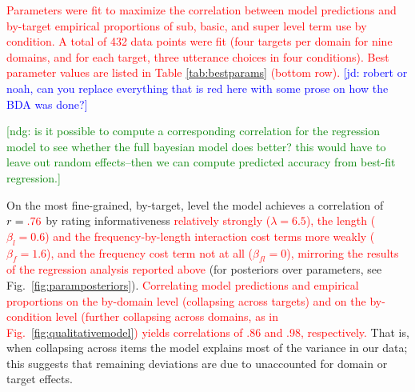 \documentclass[10pt,letterpaper]{article}
\newcommand{\jd}[1]{\textcolor{Blue}{[jd: #1]}}
\newcommand{\red}[1]{\textcolor{Red}{#1}}
\newcommand{\ndg}[1]{\textcolor{Green}{[ndg: #1]}}
\newcommand{\tableref}[1]{Table \ref{#1}}
\newcommand{\figref}[1]{Fig.~\ref{#1}}
\begin{document}
\red{Parameters were fit to maximize the correlation between model predictions and by-target empirical proportions of sub, basic, and super level term use by condition. A total of 432 data points were fit (four targets per domain for nine domains, and for each target, three utterance choices in four conditions).  Best parameter values are listed in \tableref{tab:bestparams} (bottom row). } \jd{robert or noah, can you replace everything that is red here with some prose on how the BDA was done?}

\ndg{is it possible to compute a corresponding correlation for the regression model to see whether the full bayesian model does better? this would have to leave out random effects--then we can compute predicted accuracy from best-fit regression.}
%


On the most fine-grained, by-target, level the model achieves a correlation of $r = \red{.76}$ by rating informativeness \red{relatively strongly ($\lambda = 6.5$), the length  ($\beta_l = 0.6$) and the frequency-by-length interaction  cost terms more weakly ($\beta_f = 1.6$),  and the frequency cost term not at all ($\beta_{fl} = 0$), mirroring the results of the regression analysis reported above} (for posteriors over parameters, see \figref{fig:paramposteriors}). \red{Correlating model predictions and empirical proportions on the by-domain level (collapsing across targets) and on the by-condition level (further collapsing across domains, as in \figref{fig:qualitativemodel}) yields correlations of .86 and .98, respectively.}
That is, when collapsing across items the model explains most of the variance in our data; this suggests that remaining deviations are due to unaccounted for domain or target effects.
\end{document}
